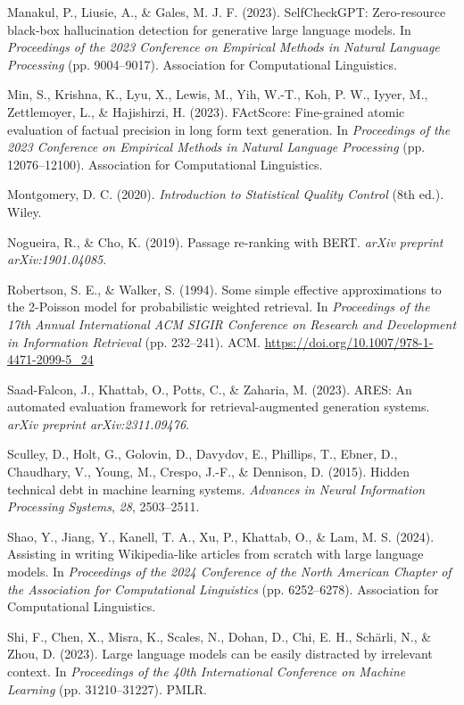 {Manakul, P., Liusie, A., \& Gales, M. J. F. (2023). SelfCheckGPT: Zero-resource black-box hallucination detection for generative large language models. In \textit{Proceedings of the 2023 Conference on Empirical Methods in Natural Language Processing} (pp. 9004--9017). Association for Computational Linguistics.

Min, S., Krishna, K., Lyu, X., Lewis, M., Yih, W.-T., Koh, P. W., Iyyer, M., Zettlemoyer, L., \& Hajishirzi, H. (2023). FActScore: Fine-grained atomic evaluation of factual precision in long form text generation. In \textit{Proceedings of the 2023 Conference on Empirical Methods in Natural Language Processing} (pp. 12076--12100). Association for Computational Linguistics.

Montgomery, D. C. (2020). \textit{Introduction to Statistical Quality Control} (8th ed.). Wiley.

Nogueira, R., \& Cho, K. (2019). Passage re-ranking with BERT. \textit{arXiv preprint arXiv:1901.04085}.

Robertson, S. E., \& Walker, S. (1994). Some simple effective approximations to the 2-Poisson model for probabilistic weighted retrieval. In \textit{Proceedings of the 17th Annual International ACM SIGIR Conference on Research and Development in Information Retrieval} (pp. 232--241). ACM. \url{https://doi.org/10.1007/978-1-4471-2099-5_24}

Saad-Falcon, J., Khattab, O., Potts, C., \& Zaharia, M. (2023). ARES: An automated evaluation framework for retrieval-augmented generation systems. \textit{arXiv preprint arXiv:2311.09476}.

Sculley, D., Holt, G., Golovin, D., Davydov, E., Phillips, T., Ebner, D., Chaudhary, V., Young, M., Crespo, J.-F., \& Dennison, D. (2015). Hidden technical debt in machine learning systems. \textit{Advances in Neural Information Processing Systems}, \textit{28}, 2503--2511.

Shao, Y., Jiang, Y., Kanell, T. A., Xu, P., Khattab, O., \& Lam, M. S. (2024). Assisting in writing Wikipedia-like articles from scratch with large language models. In \textit{Proceedings of the 2024 Conference of the North American Chapter of the Association for Computational Linguistics} (pp. 6252--6278). Association for Computational Linguistics.

Shi, F., Chen, X., Misra, K., Scales, N., Dohan, D., Chi, E. H., Sch\"{a}rli, N., \& Zhou, D. (2023). Large language models can be easily distracted by irrelevant context. In \textit{Proceedings of the 40th International Conference on Machine Learning} (pp. 31210--31227). PMLR.

}
